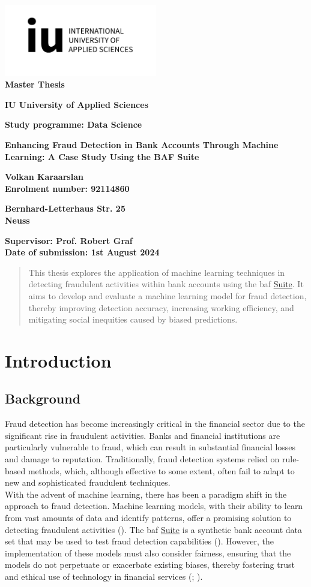 \documentclass[12pt,a4paper]{report}
\renewcommand{\maketitle}{
    \begin{titlepage}
       \noindent
        \vspace*{1cm}
        \begin{center}
            \includegraphics[width=0.5\textwidth]{iu_Logo_EN_black_RGB_horizontal.jpg}\\[0.5cm]
    
            \textbf{\fontsize{14pt}{16pt}\selectfont Master Thesis}
            \vspace{1.5cm}
    
            \textbf{\fontsize{14pt}{16pt}\selectfont IU University of Applied Sciences}
            \vspace{0.5cm}
    
            \textbf{\fontsize{14pt}{16pt}\selectfont Study programme: Data Science}
            \vspace{2.0cm}
    
            \textbf{\fontsize{14pt}{16pt}\selectfont Enhancing Fraud Detection in Bank Accounts Through Machine Learning: A Case Study Using the BAF Suite}
            
            \vspace{2.0cm}
            \textbf{\fontsize{14pt}{16pt}\selectfont Volkan Karaarslan}\\
            \vspace{0.5cm}
            \textbf{\fontsize{14pt}{16pt}\selectfont Enrolment number: 92114860}\\
            
            \vspace{0.5cm}
            
            \textbf{\fontsize{14pt}{16pt}\selectfont Bernhard-Letterhaus Str. 25}\\
            \vspace{0.5cm}
            \textbf{\fontsize{14pt}{16pt}\selectfont 41466 Neuss}
            
        \end{center}
        
        \vspace*{\fill}
        \noindent
        \textbf{\fontsize{14pt}{16pt}\selectfont Supervisor: Prof. Robert Graf}\\
        \textbf{\fontsize{14pt}{16pt}\selectfont Date of submission: 1st August 2024}
    \end{titlepage}
}
\begin{document}
\maketitle


\begin{abstract}
This thesis explores the application of machine learning techniques in detecting fraudulent activities within bank accounts using the \acrshort{baf} \href{https://www.kaggle.com/datasets/sgpjesus/bank-account-fraud-dataset-neurips-2022/code}{Suite}. It aims to develop and evaluate a machine learning model for fraud detection, thereby improving detection accuracy, increasing working efficiency, and mitigating social inequities caused by biased predictions.
\end{abstract}

\printglossary[type=\acronymtype, title=Abbreviations]

\clearpage

\tableofcontents



\clearpage


\chapter{Introduction}


\section{Background}
Fraud detection has become increasingly critical in the financial sector due to the significant rise in fraudulent activities. Banks and financial institutions are particularly vulnerable to fraud, which can result in substantial financial losses and damage to reputation. Traditionally, fraud detection systems relied on rule-based methods, which, although effective to some extent, often fail to adapt to new and sophisticated fraudulent techniques.\\

With the advent of machine learning, there has been a paradigm shift in the approach to fraud detection. Machine learning models, with their ability to learn from vast amounts of data and identify patterns, offer a promising solution to detecting fraudulent activities (\citealp[p.4]{bao2020detecting}). The \acrshort{baf} \href{https://www.kaggle.com/datasets/sgpjesus/bank-account-fraud-dataset-neurips-2022/code}{Suite} is a synthetic bank account data set that may be used to test fraud detection capabilities (\citealp{jesus2022turning}). However, the implementation of these models must also consider fairness, ensuring that the models do not perpetuate or exacerbate existing biases, thereby fostering trust and ethical use of technology in financial services (\citealp[p.114]{barocas2023fairness}; \citealp[p.12]{mehrabi2021survey}).\\
\end{document}
